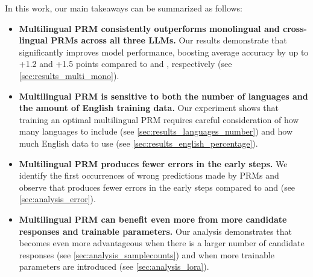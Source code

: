 In this work, our main takeaways can be summarized as follows:
\begin{itemize}


    \item \textbf{Multilingual PRM consistently outperforms monolingual and cross-lingual PRMs across all three LLMs.} Our results demonstrate that \mix significantly improves model performance, boosting average accuracy by up to +1.2 and +1.5 points compared to \en and \mono, respectively (see \autoref{sec:results_multi_mono}).

    \item \textbf{Multilingual PRM is sensitive to both the number of languages and the amount of English training data.} Our experiment shows that training an optimal multilingual PRM requires careful consideration of how many languages to include (see \autoref{sec:results_languages_number}) and how much English data to use (see \autoref{sec:results_english_percentage}).

    \item \textbf{Multilingual PRM produces fewer errors in the early steps.} We identify the first occurrences of wrong predictions made by PRMs and observe that \mix produces fewer errors in the early steps compared to \mono and \en (see \autoref{sec:analysis_error}).

    \item \textbf{Multilingual PRM can benefit even more from more candidate responses and trainable parameters.} Our analysis demonstrates that \mix becomes even more advantageous when there is a larger number of candidate responses (see \autoref{sec:analysis_samplecounts}) and when more trainable parameters are introduced (see \autoref{sec:analysis_lora}).
    
\end{itemize}







